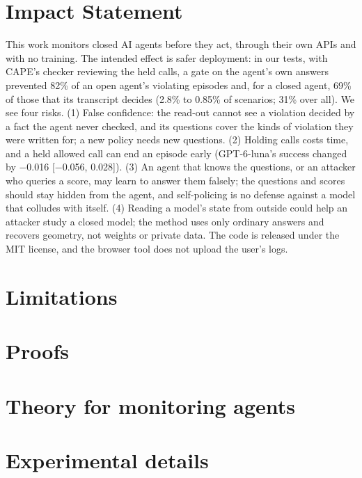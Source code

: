 \documentclass{article}
\theoremstyle{plain}
\theoremstyle{definition}
\begin{document}
\section*{Impact Statement}
This work monitors closed AI agents before they act, through their own APIs and with no training. The intended effect is safer deployment: in our tests, with CAPE's checker reviewing the held calls, a gate on the agent's own answers prevented 82\% of an open agent's violating episodes and, for a closed agent, 69\% of those that its transcript decides (2.8\% to 0.85\% of scenarios; 31\% over all). We see four risks. (1) False confidence: the read-out cannot see a violation decided by a fact the agent never checked, and its questions cover the kinds of violation they were written for; a new policy needs new questions. (2) Holding calls costs time, and a held allowed call can end an episode early (GPT-6-luna's success changed by $-$0.016 [$-$0.056, 0.028]). (3) An agent that knows the questions, or an attacker who queries a score, may learn to answer them falsely; the questions and scores should stay hidden from the agent, and self-policing is no defense against a model that colludes with itself. (4) Reading a model's state from outside could help an attacker study a closed model; the method uses only ordinary answers and recovers geometry, not weights or private data. The code is released under the MIT license, and the browser tool does not upload the user's logs.

\FloatBarrier



\newpage
\appendix
\onecolumn
\section{Limitations}
\label{app:limits}


\section{Proofs}
\label{app:proofs}



\section{Theory for monitoring agents}



\section{Experimental details}
\label{app:details}

\end{document}
